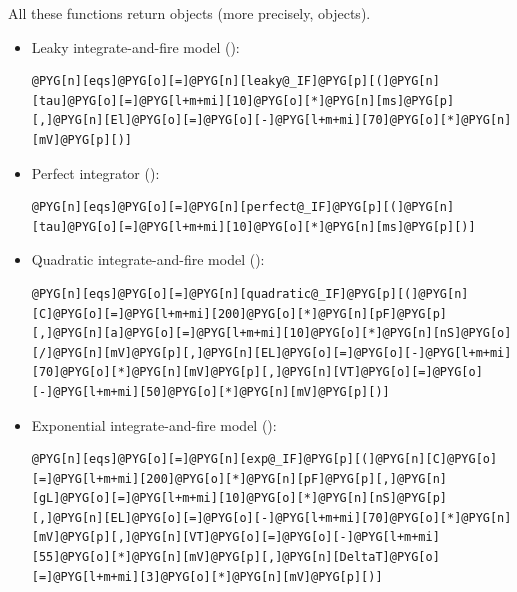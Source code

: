 \documentclass[letterpaper,10pt,english]{manual}
\begin{document}
All these functions return \hyperlink{brian.Equations}{} objects (more precisely,  objects).
\begin{itemize}
\item {} 
Leaky integrate-and-fire model ():

\begin{Verbatim}[commandchars=@\[\]]
@PYG[n][eqs]@PYG[o][=]@PYG[n][leaky@_IF]@PYG[p][(]@PYG[n][tau]@PYG[o][=]@PYG[l+m+mi][10]@PYG[o][*]@PYG[n][ms]@PYG[p][,]@PYG[n][El]@PYG[o][=]@PYG[o][-]@PYG[l+m+mi][70]@PYG[o][*]@PYG[n][mV]@PYG[p][)]
\end{Verbatim}

\item {} 
Perfect integrator ():

\begin{Verbatim}[commandchars=@\[\]]
@PYG[n][eqs]@PYG[o][=]@PYG[n][perfect@_IF]@PYG[p][(]@PYG[n][tau]@PYG[o][=]@PYG[l+m+mi][10]@PYG[o][*]@PYG[n][ms]@PYG[p][)]
\end{Verbatim}

\item {} 
Quadratic integrate-and-fire model ():

\begin{Verbatim}[commandchars=@\[\]]
@PYG[n][eqs]@PYG[o][=]@PYG[n][quadratic@_IF]@PYG[p][(]@PYG[n][C]@PYG[o][=]@PYG[l+m+mi][200]@PYG[o][*]@PYG[n][pF]@PYG[p][,]@PYG[n][a]@PYG[o][=]@PYG[l+m+mi][10]@PYG[o][*]@PYG[n][nS]@PYG[o][/]@PYG[n][mV]@PYG[p][,]@PYG[n][EL]@PYG[o][=]@PYG[o][-]@PYG[l+m+mi][70]@PYG[o][*]@PYG[n][mV]@PYG[p][,]@PYG[n][VT]@PYG[o][=]@PYG[o][-]@PYG[l+m+mi][50]@PYG[o][*]@PYG[n][mV]@PYG[p][)]
\end{Verbatim}

\item {} 
Exponential integrate-and-fire model ():

\begin{Verbatim}[commandchars=@\[\]]
@PYG[n][eqs]@PYG[o][=]@PYG[n][exp@_IF]@PYG[p][(]@PYG[n][C]@PYG[o][=]@PYG[l+m+mi][200]@PYG[o][*]@PYG[n][pF]@PYG[p][,]@PYG[n][gL]@PYG[o][=]@PYG[l+m+mi][10]@PYG[o][*]@PYG[n][nS]@PYG[p][,]@PYG[n][EL]@PYG[o][=]@PYG[o][-]@PYG[l+m+mi][70]@PYG[o][*]@PYG[n][mV]@PYG[p][,]@PYG[n][VT]@PYG[o][=]@PYG[o][-]@PYG[l+m+mi][55]@PYG[o][*]@PYG[n][mV]@PYG[p][,]@PYG[n][DeltaT]@PYG[o][=]@PYG[l+m+mi][3]@PYG[o][*]@PYG[n][mV]@PYG[p][)]
\end{Verbatim}

\end{itemize}
\end{document}
